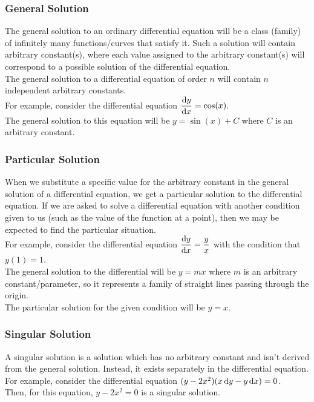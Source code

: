 \documentclass[14]{article}
\theoremstyle{definition}
\theoremstyle{case}
\begin{document}
\subsubsection{General Solution}
The general solution to an ordinary differential equation will be a class (family) of infinitely many functions/curves that satisfy it. Such a solution will contain arbitrary constant(s), where each value assigned to the arbitrary constant(s) will correspond to a possible solution of the differential equation.\\
The general solution to a differential equation of order $n$ will contain $n$ independent arbitrary constants.\\
For example, consider the differential equation
$\dfrac{\dif y}{\dif x} = \cos(x)$.\\
The general solution to this equation will be $y = \sin(x) + C$ where $C$ is an arbitrary constant.
\subsubsection{Particular Solution}
When we substitute a specific value for the arbitrary constant in the general solution of a differential equation, we get a particular solution to the differential equation. If we are asked to solve a differential equation with another condition given to us (such as the value of the function at a point), then we may be expected to find the particular situation.\\
For example, consider the differential equation 
$\dfrac{\dif y}{\dif x} = \dfrac{y}{x}$ with the condition that $y(1) = 1$.\\
The general solution to the differential will be $y=mx$ where $m$ is an arbitrary constant/parameter, so it represents a family of straight lines passing through the origin.\\ The particular solution for the given condition will be $y = x$.
\subsubsection{Singular Solution}
A singular solution is a solution which has no arbitrary constant and isn't derived from the general solution. Instead, it exists separately in the differential equation.\\
For example, consider the differential equation
$(y-2x^2)(x \dif y - y \dif x) = 0$.\\
Then, for this equation, $y - 2x^2 = 0$ is a singular solution.
\end{document}
